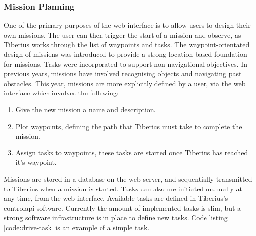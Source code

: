\subsubsection{Mission Planning}
\label{web-missions} %
\label{sec:web_design_missions}

One of the primary purposes of the web interface is to allow users to design their own missions. The user can then trigger the start of a mission and observe, as Tiberius works through the list of waypoints and tasks.
\newline
The waypoint-orientated design of missions was introduced to provide a strong location-based foundation for missions. Tasks were incorporated to support non-navigational objectives.
\newline
In previous years, missions have involved recognising objects and navigating past obstacles. This year, missions are more explicitly defined by a user, via the web interface which involves the following:

\begin{enumerate}
\item Give the new mission a name and description.
\item Plot waypoints, defining the path that Tiberius must take to complete the mission.
\item Assign tasks to waypoints, these tasks are started once Tiberius has reached it's waypoint.
\end{enumerate}

Missions are stored in a database on the web server, and sequentially transmitted to Tiberius when a mission is started. Tasks can also me initiated manually at any time, from the web interface. Available tasks are defined in Tiberius's \gls{controlapi} software. Currently the amount of implemented tasks is slim, but a strong software infrastructure is in place to define new tasks. Code listing \ref{code:drive-task} is an example of a simple task.

